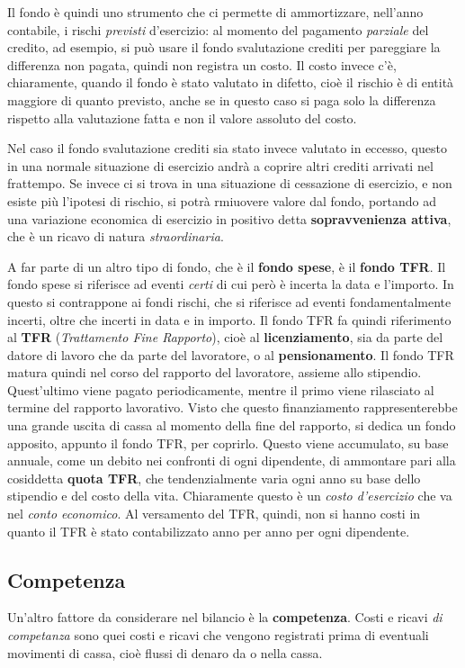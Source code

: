 \documentclass[a4paper,11pt]{article}
\begin{document}
Il fondo è quindi uno strumento che ci permette di ammortizzare, nell'anno contabile, i rischi \textit{previsti} d'esercizio: al momento del pagamento \textit{parziale} del credito, ad esempio, si può usare il fondo svalutazione crediti per pareggiare la differenza non pagata, quindi non registra un costo.
Il costo invece c'è, chiaramente, quando il fondo è stato valutato in difetto, cioè il rischio è di entità maggiore di quanto previsto, anche se in questo caso si paga solo la differenza rispetto alla valutazione fatta e non il valore assoluto del costo.

Nel caso il fondo svalutazione crediti sia stato invece valutato in eccesso, questo in una normale situazione di esercizio andrà a coprire altri crediti arrivati nel frattempo.
Se invece ci si trova in una situazione di cessazione di esercizio, e non esiste più l'ipotesi di rischio, si potrà rmiuovere valore dal fondo, portando ad una variazione economica di esercizio in positivo detta \textbf{sopravvenienza attiva}, che è un ricavo di natura \textit{straordinaria}.

A far parte di un altro tipo di fondo, che è il \textbf{fondo spese}, è il \textbf{fondo TFR}.
Il fondo spese si riferisce ad eventi \textit{certi} di cui però è incerta la data e l'importo.
In questo si contrappone ai fondi rischi, che si riferisce ad eventi fondamentalmente incerti, oltre che incerti in data e in importo.
Il fondo TFR fa quindi riferimento al \textbf{TFR} (\textit{Trattamento Fine Rapporto}), cioè al \textbf{licenziamento}, sia da parte del datore di lavoro che da parte del lavoratore, o al \textbf{pensionamento}.
Il fondo TFR matura quindi nel corso del rapporto del lavoratore, assieme allo stipendio.
Quest'ultimo viene pagato periodicamente, mentre il primo viene rilasciato al termine del rapporto lavorativo.
Visto che questo finanziamento rappresenterebbe una grande uscita di cassa al momento della fine del rapporto, si dedica un fondo apposito, appunto il fondo TFR, per coprirlo. 
Questo viene accumulato, su base annuale, come un debito nei confronti di ogni dipendente, di ammontare pari alla cosiddetta \textbf{quota TFR}, che tendenzialmente varia ogni anno su base dello stipendio e del costo della vita.
Chiaramente questo è un \textit{costo d'esercizio} che va nel \textit{conto economico}.
Al versamento del TFR, quindi, non si hanno costi in quanto il TFR è stato contabilizzato anno per anno per ogni dipendente.

\subsection{Competenza}
Un'altro fattore da considerare nel bilancio è la \textbf{competenza}.
Costi e ricavi \textit{di competanza} sono quei costi e ricavi che vengono registrati prima di eventuali movimenti di cassa, cioè flussi di denaro da o nella cassa.
\end{document}
